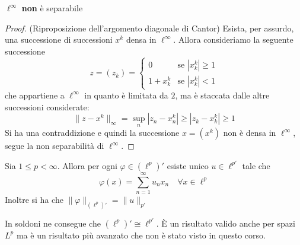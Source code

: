 \begin{proposition}
    \(\ell^{\infty}\) \textbf{non} è separabile
\end{proposition}
\begin{proof}
    (Riproposizione dell'argomento diagonale di Cantor)
    Esista, per assurdo, una successione di successioni \(x^{k}\) densa in
    \(\ell^{\infty}\). Allora consideriamo la seguente successione
    \[
      z = {(z_k)} = \begin{cases}
          0 & \text{se } |x^{k}_{k}| \ge 1 \\
          1 + x^{k}_k & \text{se } |x^{k}_{k}| < 1
      \end{cases}
    \]
    che appartiene a \(\ell^{\infty}\) in quanto è limitata da \(2\), ma è
    staccata dalle altre successioni considerate:
    \[\|z - x^{k}\|_{\infty} = \sup_n |z_{n} - x^{k}_n| \ge |z_k - x^{k}_k| \ge
    1\] 
    Si ha una contraddizione e quindi la successione \(x= {(x^{k})}\)
    non è densa in \(\ell^\infty\), segue la non separabilità di
    \(\ell^\infty\). 
\end{proof}
\begin{theorem}
    Sia \(1 \le p < \infty\). Allora per ogni \(\varphi  \in {(\ell^{p})}'\)
    esiste unico \(u \in \ell^{p'}\) tale che 
    \[
      \varphi {(x)} = \sum_{n=1}^{\infty} u_{n} x_{n} \quad \forall x \in
      \ell^{p} 
    \]
    Inoltre si ha che \(\|\varphi \|_{(\ell^{p})'} = \|u\|_{p'} \) 
\end{theorem}
\begin{remark}
    In soldoni ne consegue che \((\ell^{p})' \cong \ell^{p'}\). È un
    risultato valido anche per spazi \(L^{p}\) ma è un risultato più avanzato
    che non è stato visto in questo corso.
\end{remark}
